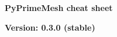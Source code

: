 \documentclass[9pt,landscape]{article}
\begin{document}
\raggedright
\footnotesize


\begin{center}
     \Huge{\textbf{PyPrimeMesh cheat sheet}} \\
\end{center}
\begin{center}
  \small{\textbf{Version: 0.3.0 (stable)}} \\
\end{center}
\vspace{-0.15cm}
\noindent\makebox[\linewidth]{\rule{\paperwidth}{2pt}}
\end{document}
